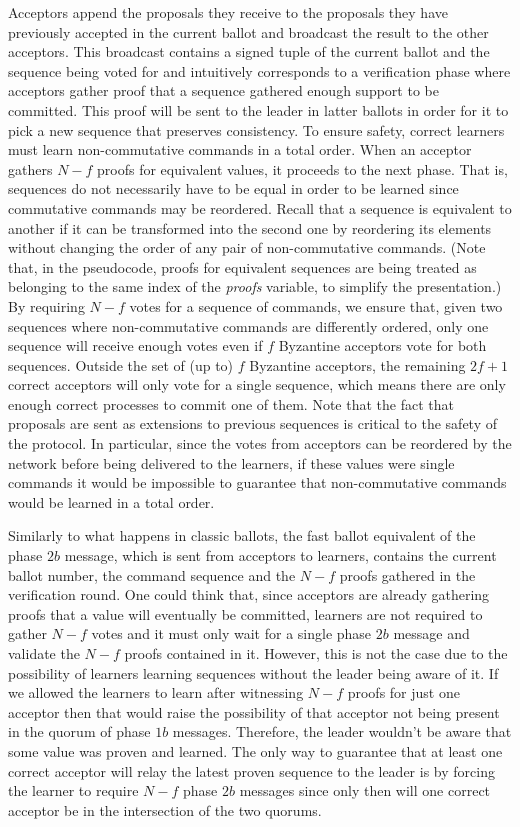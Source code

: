 Acceptors append the proposals they receive to the proposals they have previously accepted in the current ballot and broadcast the result to the other acceptors. This broadcast contains a signed tuple of the current ballot and the sequence being voted for and intuitively corresponds to a verification phase where acceptors gather proof that a sequence gathered enough support to be committed. This proof will be sent to the leader in latter ballots in order for it to pick a new sequence that preserves consistency. To ensure safety, correct learners must learn non-commutative commands in a total order. When an acceptor gathers $N-f$ proofs for equivalent values, it proceeds to the next phase. That is, sequences do not necessarily have to be equal in order to be learned since commutative commands may be reordered. Recall that a sequence is equivalent to another if it can be transformed into the second one by reordering its elements without changing the order of any pair of non-commutative commands. (Note that, in the pseudocode, proofs for equivalent sequences are being treated as belonging to the same index of the \emph{proofs} variable, to simplify the presentation.) By requiring $N-f$ votes for a sequence of commands, we ensure that, given two sequences where non-commutative commands are differently ordered, only one sequence will receive enough votes even if $f$ Byzantine acceptors vote for both sequences. Outside the set of (up to) $f$ Byzantine acceptors, the remaining $2f+1$ correct acceptors will only vote for a single sequence, which means there are only enough correct processes to commit one of them. Note that the fact that proposals are sent as extensions to previous sequences is critical to the safety of the protocol. In particular, since the votes from acceptors can be reordered by the network before being delivered to the learners, if these values were single commands it would be impossible to guarantee that non-commutative commands would be learned in a total order. \par
{} Similarly to what happens in classic ballots, the fast ballot equivalent of the phase $2b$ message, which is sent from acceptors to learners, contains the current ballot number, the command sequence and the $N-f$ proofs gathered in the verification round. One could think that, since acceptors are already gathering proofs that a value will eventually be committed, learners are not required to gather $N-f$ votes and it must only wait for a single phase $2b$ message and validate the $N-f$ proofs contained in it. However, this is not the case due to the possibility of learners learning sequences without the leader being aware of it. {\color{red} If we allowed the learners to learn after witnessing $N-f$ proofs for just one acceptor then that would raise the possibility of that acceptor not being present in the quorum of phase $1b$ messages. Therefore, the leader wouldn't be aware that some value was proven and learned.} The only way to guarantee that at least one correct acceptor will relay the latest proven sequence to the leader is by forcing the learner to require $N-f$ phase $2b$ messages since only then will one correct acceptor be in the intersection of the two quorums. \par
